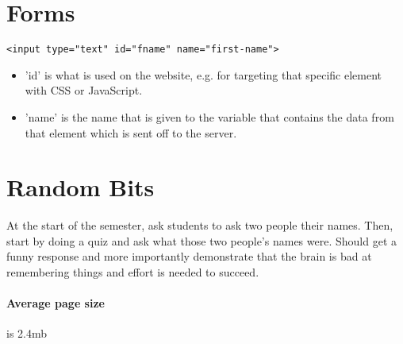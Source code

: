 \documentclass[]{article}
\begin{document}
\section{Forms}
\begin{lstlisting}
<input type="text" id="fname" name="first-name">
\end{lstlisting}
\begin{itemize}
	\item 'id' is what is used on the website, e.g. for targeting that specific element with CSS or JavaScript.
	\item 'name' is the name that is given to the variable that contains the data from that element which is sent off to the server.
\end{itemize}


\section{Random Bits}
At the start of the semester, ask students to ask two people their names.  Then, start by doing a quiz and ask what those two people's names were.  Should get a funny response and more importantly demonstrate that the brain is bad at remembering things and effort is needed to succeed.

\paragraph{Average page size} is 2.4mb 
\end{document}
